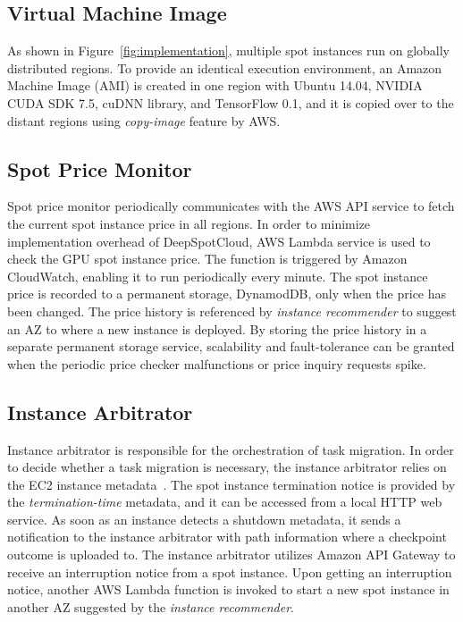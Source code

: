 \documentclass[conference]{IEEEtran}
\begin{document}
\subsection{Virtual Machine Image}
As shown in Figure~\ref{fig:implementation}, multiple spot instances run on globally distributed regions. To provide an identical execution environment, an Amazon Machine Image (AMI) is created in one region with Ubuntu 14.04, NVIDIA CUDA SDK 7.5, cuDNN library, and TensorFlow 0.1, and it is copied over to the distant regions using \emph{copy-image} feature by AWS.

\subsection{Spot Price Monitor}
Spot price monitor periodically communicates with the AWS API service to fetch the current spot instance price in all regions. In order to minimize implementation overhead of DeepSpotCloud, AWS Lambda service is used to check the GPU spot instance price. The function is triggered by Amazon CloudWatch, enabling it to run periodically every minute. The spot instance price is recorded to a permanent storage, DynamodDB, only when the price has been changed. The price history is referenced by \textit{instance recommender} to suggest an AZ to where a new instance is deployed. By storing the price history in a separate permanent storage service, scalability and fault-tolerance can be granted when the periodic price checker malfunctions or price inquiry requests spike.

\subsection{Instance Arbitrator}
Instance arbitrator is responsible for the orchestration of task migration. In order to decide whether a task migration is necessary, the instance arbitrator relies on the EC2 instance metadata~\cite{aws-metadata}. The spot instance termination notice is provided by the \textit{termination-time} metadata, and it can be accessed from a local HTTP web service. As soon as an instance detects a shutdown metadata, it sends a notification to the instance arbitrator with path information where a checkpoint outcome is uploaded to. The instance arbitrator utilizes Amazon API Gateway to receive an interruption notice from a spot instance. Upon getting an interruption notice, another AWS Lambda function is invoked to start a new spot instance in another AZ suggested by the \textit{instance recommender}.
\end{document}
